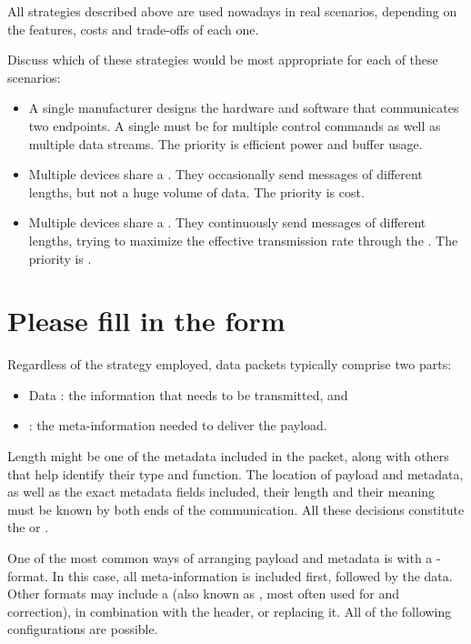 \begin{exercise}
All strategies described above are used nowadays in real scenarios, depending on the 
features, costs and trade-offs of each one.

Discuss which of these strategies would be most appropriate for each of these scenarios:
\begin{itemize}
\item A single manufacturer designs the hardware and software that communicates two endpoints.
A single  must be  for multiple control commands
as well as multiple data streams. The priority is efficient power and buffer usage.

\item Multiple devices share a . They occasionally send messages of different lengths,
but not a huge volume of data. The priority is cost.

\item Multiple devices share a . They continuously send messages of different lengths,
trying to maximize the effective transmission rate through the . 
The priority is .
\end{itemize}
\end{exercise}

\section{Please fill in the form}\label{sec:packets:format}

Regardless of the strategy employed, data packets typically comprise two parts: 
\begin{itemize}
 \item Data : the information that needs to be transmitted, and
 \item {}: the meta-information needed to deliver the payload.
\end{itemize}
Length might be one of the metadata  included in the packet, along with 
others that help identify their type and function.
% 
The location of payload and metadata, as well as the exact metadata fields included, their length and their meaning
must be known by both ends of the communication. All these decisions constitute the 
or .

One of the most common ways of arranging payload and metadata is with a - format.
In this case, all meta-information is included first, followed by the data. 
Other formats may include a  (also known as , most often used for 
and correction), in combination with the header, or replacing it.
All of the following configurations are possible.

